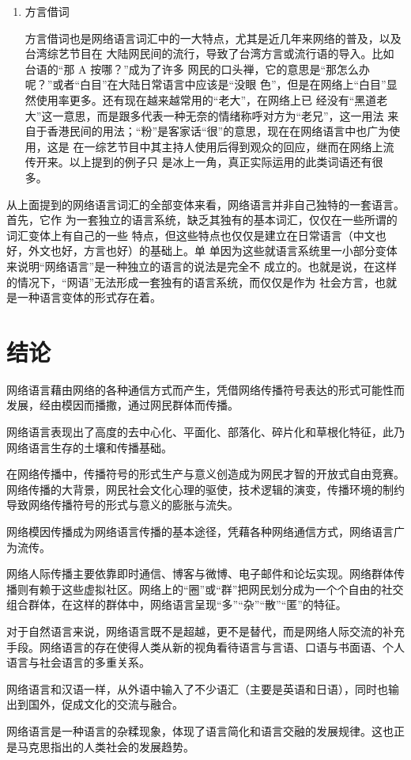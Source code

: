 \begin{enumerate}
\item 方言借词

方言借词也是网络语言词汇中的一大特点，尤其是近几年来网络的普及，以及台湾综艺节目在
大陆网民间的流行，导致了台湾方言或流行语的导入。比如台语的“那 A 按哪？”成为了许多
网民的口头禅，它的意思是“那怎么办呢？”或者“白目”在大陆日常语言中应该是“没眼
色”，但是在网络上“白目”显然使用率更多。还有现在越来越常用的“老大”，在网络上已
经没有“黑道老大”这一意思，而是跟多代表一种无奈的情绪称呼对方为“老兄”，这一用法
来自于香港民间的用法；“粉”是客家话“很”的意思，现在在网络语言中也广为使用，这是
在一综艺节目中其主持人使用后得到观众的回应，继而在网络上流传开来。以上提到的例子只
是冰上一角，真正实际运用的此类词语还有很多。

\end{enumerate}

从上面提到的网络语言词汇的全部变体来看，网络语言并非自己独特的一套语言。首先，它作
为一套独立的语言系统，缺乏其独有的基本词汇，仅仅在一些所谓的词汇变体上有自己的一些
特点，但这些特点也仅仅是建立在日常语言（中文也好，外文也好，方言也好）的基础上。单
单因为这些就语言系统里一小部分变体来说明“网络语言”是一种独立的语言的说法是完全不
成立的。也就是说，在这样的情况下，“网语”无法形成一套独有的语言系统，而仅仅是作为
社会方言，也就是一种语言变体的形式存在着。

\section{结论}

网络语言藉由网络的各种通信方式而产生，凭借网络传播符号表达的形式可能性而发展，经由模因而播撒，通过网民群体而传播。

网络语言表现出了高度的去中心化、平面化、部落化、碎片化和草根化特征，此乃网络语言生存的土壤和传播基础。

在网络传播中，传播符号的形式生产与意义创造成为网民才智的开放式自由竞赛。网络传播的大背景，网民社会文化心理的驱使，技术逻辑的演变，传播环境的制约导致网络传播符号的形式与意义的膨胀与流失。

网络模因传播成为网络语言传播的基本途径，凭藉各种网络通信方式，网络语言广为流传。

网络人际传播主要依靠即时通信、博客与微博、电子邮件和论坛实现。网络群体传播则有赖于这些虚拟社区。网络上的“圈”或“群”把网民划分成为一个个自由的社交组合群体，在这样的群体中，网络语言呈现“多”“杂”“散”“匿”的特征。

对于自然语言来说，网络语言既不是超越，更不是替代，而是网络人际交流的补充手段。网络语言的存在使得人类从新的视角看待语言与言语、口语与书面语、个人语言与社会语言的多重关系。

网络语言和汉语一样，从外语中输入了不少语汇（主要是英语和日语），同时也输出到国外，促成文化的交流与融合。

网络语言是一种语言的杂糅现象，体现了语言简化和语言交融的发展规律。这也正是马克思指出的人类社会的发展趋势。
